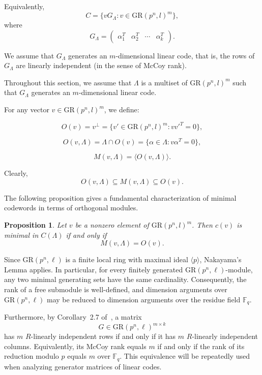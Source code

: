 \documentclass[10pt]{article}
\newtheorem{prop}[lem]{Proposition}
\theoremstyle{definition}
\begin{document}
Equivalently,
\[
C = \{v G_\Lambda : v \in \mathrm{GR}(p^n,l)^m\},
\]
where
\[
G_\Lambda
=
\begin{pmatrix}
\alpha_1^T & \alpha_2^T & \cdots & \alpha_k^T
\end{pmatrix}.
\]

We assume that $G_\Lambda$ generates an $m$-dimensional linear code,
that is, the rows of $G_\Lambda$ are linearly independent
(in the sense of McCoy rank).

Throughout this section, we assume that $\Lambda$
is a multiset of $\mathrm{GR}(p^n,l)^m$
such that $G_\Lambda$ generates an $m$-dimensional linear code.

For any vector $v \in \mathrm{GR}(p^n,l)^m$,
we define:

\[
O(v) = v^\perp
=
\{ v' \in \mathrm{GR}(p^n,l)^m : v v'^T = 0 \},
\]

\[
O(v,\Lambda)
=
\Lambda \cap O(v)
=
\{ \alpha \in \Lambda : v\alpha^T = 0 \},
\]

\[
M(v,\Lambda)
=
\langle O(v,\Lambda) \rangle.
\]

Clearly,
\[
O(v,\Lambda)
\subseteq
M(v,\Lambda)
\subseteq
O(v).
\]

\medskip

The following proposition gives a fundamental characterization
of minimal codewords in terms of orthogonal modules.

\begin{prop}\label{Proposition 13}
Let $v$ be a nonzero element of $\mathrm{GR}(p^n,l)^m$.
Then $c(v)$ is minimal in $C(\Lambda)$
if and only if
\[
M(v,\Lambda)=O(v).
\]
\end{prop}



Since $\mathrm{GR}(p^{n},\ell)$ is a finite local ring with maximal ideal $\langle p\rangle$, Nakayama's Lemma applies.
In particular, for every finitely generated $\mathrm{GR}(p^{n},\ell)$-module,
any two minimal generating sets have the same cardinality.
Consequently, the rank of a free submodule is well-defined,
and dimension arguments over $\mathrm{GR}(p^{n},\ell)$ may be reduced to
dimension arguments over the residue field $\mathbb{F}_q$.

Furthermore, by Corollary~2.7 of~\cite{NortonSalagean}, a matrix
\[
G \in \mathrm{GR}(p^{n},\ell)^{m \times k}
\]
has $m$ $R$-linearly independent rows if and only if it has
$m$ $R$-linearly independent columns.
Equivalently, its McCoy rank equals $m$ if and only if the rank
of its reduction modulo $p$ equals $m$ over $\mathbb{F}_q$.
This equivalence will be repeatedly used when analyzing generator matrices of linear codes.
\end{document}
